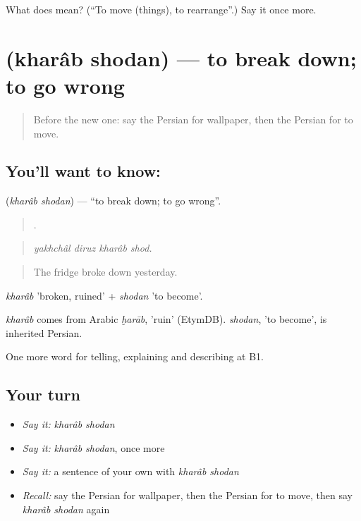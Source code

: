 \begin{tcolorbox}[breakable,colback=teal!4,colframe=teal!35!black,title={Before you move on}]
What does   mean? (\textquotedblleft{}To move (things), to rearrange\textquotedblright{}.) Say it once more.
\end{tcolorbox}
\section[\texorpdfstring{\fa{خراب} \fa{شدن} (kharâb shodan)}{خراب شدن (kharâb shodan)}]{  (kharâb shodan) — to break down; to go wrong}

\label{lesson:FA-C537-kharab-shodan}



\begin{quote}
Before the new one: say the Persian for wallpaper, then the Persian for to move.
\end{quote}

\subsection*{You'll want to know:  }
\textbf{ } (\emph{kharâb shodan}) — \textquotedblleft{}to break down; to go wrong\textquotedblright{}.

\begin{quote}
   .
\end{quote}

\begin{quote}
\emph{yakhchâl diruz kharâb shod.}
\end{quote}

\begin{quote}
The fridge broke down yesterday.
\end{quote}

\emph{kharâb} 'broken, ruined' + \emph{shodan} 'to become'.

\begin{cousinweb}
\emph{kharâb} comes from Arabic \emph{ḫarāb}, 'ruin' (EtymDB). \emph{shodan}, 'to become', is inherited Persian.
\end{cousinweb}

\begin{grammarlens}[title={What you've built}]
One more word for telling, explaining and describing at B1.
\end{grammarlens}

\subsection*{Your turn}
\begin{itemize}
\raggedright
  \item \emph{Say it:} \emph{kharâb shodan}
  \item \emph{Say it:} \emph{kharâb shodan}, once more
  \item \emph{Say it:} a sentence of your own with \emph{kharâb shodan}
  \item \emph{Recall:} say the Persian for wallpaper, then the Persian for to move, then say \emph{kharâb shodan} again
\end{itemize}

